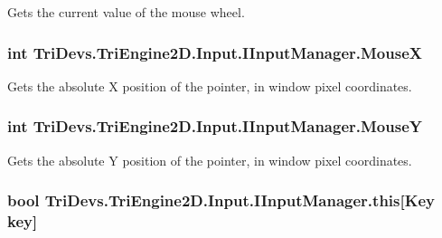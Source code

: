 Gets the current value of the mouse wheel. 

\hypertarget{interface_tri_devs_1_1_tri_engine2_d_1_1_input_1_1_i_input_manager_a545e03fc7c5084bcf00f018145625c19}{
\subsubsection[{Mouse\-X}]{\setlength{\rightskip}{0pt plus 5cm}int Tri\-Devs.\-Tri\-Engine2\-D.\-Input.\-I\-Input\-Manager.\-Mouse\-X\hspace{0.3cm}{\ttfamily [get]}}}\label{interface_tri_devs_1_1_tri_engine2_d_1_1_input_1_1_i_input_manager_a545e03fc7c5084bcf00f018145625c19}


Gets the absolute X position of the pointer, in window pixel coordinates. 

\hypertarget{interface_tri_devs_1_1_tri_engine2_d_1_1_input_1_1_i_input_manager_a143f5147279fe1807635d1e8b9b4e7c7}{
\subsubsection[{Mouse\-Y}]{\setlength{\rightskip}{0pt plus 5cm}int Tri\-Devs.\-Tri\-Engine2\-D.\-Input.\-I\-Input\-Manager.\-Mouse\-Y\hspace{0.3cm}{\ttfamily [get]}}}\label{interface_tri_devs_1_1_tri_engine2_d_1_1_input_1_1_i_input_manager_a143f5147279fe1807635d1e8b9b4e7c7}


Gets the absolute Y position of the pointer, in window pixel coordinates. 

\hypertarget{interface_tri_devs_1_1_tri_engine2_d_1_1_input_1_1_i_input_manager_a4864942443d3939d630504c7da9fbfd6}{
\subsubsection[{this[Key key]}]{\setlength{\rightskip}{0pt plus 5cm}bool Tri\-Devs.\-Tri\-Engine2\-D.\-Input.\-I\-Input\-Manager.\-this\mbox{[}Key key\mbox{]}\hspace{0.3cm}{\ttfamily [get]}}}\label{interface_tri_devs_1_1_tri_engine2_d_1_1_input_1_1_i_input_manager_a4864942443d3939d630504c7da9fbfd6}



